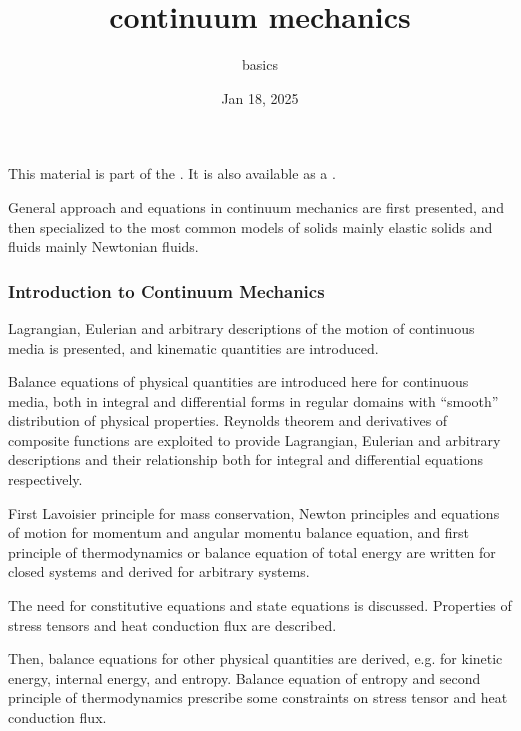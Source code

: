 \documentclass[letterpaper,10pt,english]{jupyterBook}
\title{continuum mechanics}
\date{Jan 18, 2025}
\author{basics}
\begin{document}
\pagestyle{empty}
\sphinxmaketitle
\pagestyle{plain}
\sphinxtableofcontents
\pagestyle{normal}
\label{\detokenize{intro::doc}}


\sphinxAtStartPar
This material is part of the . It is also available as a .

\sphinxAtStartPar
General approach and equations in continuum mechanics are first presented, and then specialized to the most common models of solids \sphinxhyphen{} mainly elastic solids \sphinxhyphen{} and fluids \sphinxhyphen{} mainly Newtonian fluids.
\subsubsection*{Introduction to Continuum Mechanics}

\sphinxAtStartPar
{} Lagrangian, Eulerian and arbitrary descriptions of the motion of continuous media is presented, and kinematic quantities are introduced.

\sphinxAtStartPar
{} Balance equations of physical quantities are introduced here for continuous media, both in integral and differential forms \sphinxhyphen{} in regular domains with “smooth” distribution of physical properties. Reynolds theorem and derivatives of composite functions are exploited to provide Lagrangian, Eulerian and arbitrary descriptions \sphinxhyphen{} and their relationship \sphinxhyphen{} both for integral and differential equations respectively.

\sphinxAtStartPar
First Lavoisier principle for mass conservation, Newton principles and equations of motion for momentum and angular momentu balance equation, and first principle of thermodynamics or balance equation of total energy are written for closed systems \sphinxhyphen{} and derived for arbitrary systems.

\sphinxAtStartPar
The need for constitutive equations and state equations is discussed. Properties of stress tensors and heat conduction flux are described.

\sphinxAtStartPar
Then, balance equations for other physical quantities are derived, e.g. for kinetic energy, internal energy, and entropy. Balance equation of entropy and second principle of thermodynamics prescribe some constraints on stress tensor and heat conduction flux.
\end{document}
